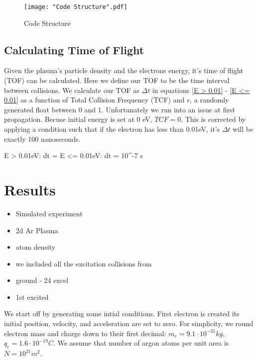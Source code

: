 \documentclass[12pt]{article}
\begin{document}
\begin{figure}[h]
	\centering
 	\texttt{[image: "Code Structure".pdf]}
	\caption{Code Structure}
	\label{Code Structure}
\end{figure}


\subsection{Calculating Time of Flight}
Given the plasma's particle density and the electrons energy, it's time of flight (TOF) can be calculated. Here we define our TOF to be the time interval between collisions. We calculate our TOF as $\Delta t$ in equations \ref{E > 0.01} -  
\ref{E <= 0.01} as a function of Total Collision Frequency (TCF) and $r$, a randomly generated float between 0 and 1. Unfortunately we 
run into an issue at first propagation. Becuse initial  energy is set at 0 eV, $TCF = 0$. This is corrected by applying a condition such that 
if the electron has less than 0.01eV, it’s $\Delta t$ will be exactly 100 nanoseconds. 



\beqn
E > 0.01eV: dt = 
\label{E > 0.01}
\eeqn
\vspace{-0.8 cm}
\beqn
E <= 0.01eV: dt = 10^{-7} s
\label{E <= 0.01}
\eeqn







\section{Results}

\begin{itemize}
	\item Simulated experiment
	\item 2d Ar Plasma
	\item atom density
	\item we included all the excitation collisions from
		\item  ground - 24 excel
		\item 1st excited 
\end{itemize}




We start off by generating some intial conditions.
First electron is created its initial position, velocity, and acceleration are set to zero. For simplicity, we round
electron mass and charge down to their first decimal: $m_{e} = 9.1\cdot10^{-31} kg$, $q_{e} = 
1.6\cdot10^{-19} C$. We assume that number of 
argon atoms per unit area is $N = 10^{21} m^2$. 
\end{document}

